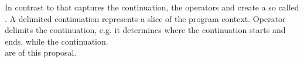 In contrast to \cc that captures the  continuation, the
operators \shift and \reset create a so called . A
delimited continuation represents a slice of the program context. Operator
\reset delimits the continuation, e.g. it determines where the continuation
starts and ends, while \shift {} the continuation.\\
 are  of this proposal.
